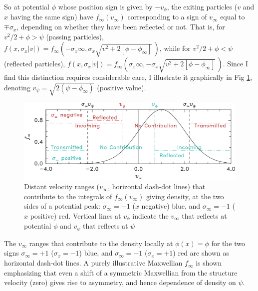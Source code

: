 \documentclass[12pt]{article}
\begin{document}
So at potential $\phi$ whose position sign is given by $-v_\phi$, the
exiting particles ($v$ and $x$ having the same sign) have
$f_\infty(v_\infty)$ corresponding to a sign of $v_\infty$ equal to
$\mp \sigma_x$, depending on whether they have been reflected or not.
That is, for $v^2/2+\phi>\psi$ (passing particles),
$f(x,\sigma_x|v|)=
f_\infty(-\sigma_x\infty,\sigma_x\sqrt{v^2+2[\phi-\phi_\infty]}\,)$,
while for $v^2/2+\phi<\psi$ (reflected particles),
$f(x,\sigma_x|v|)=
f_\infty(\sigma_x\infty,-\sigma_x\sqrt{v^2+2[\phi-\phi_\infty]}\,)$. Since
I find this distinction requires considerable care, I illustrate it
graphically in Fig \ref{contribs}, denoting
$v_\psi=\sqrt{2(\psi-\phi_\infty)}$ (positive value).
\begin{figure}[htp]
\centering
\includegraphics[width=.8\hsize]{contribs}  
\caption{Distant velocity ranges ($v_\infty$, horizontal dash-dot
  lines) that contribute to the integrals of $f_\infty(v_\infty)$
  giving density, at the two sides of a potential peak: $\sigma_\infty=+1$
  ($x$ negative) blue, and $\sigma_\infty=-1$ ($x$ positive) red. Vertical
  lines at $v_\phi$ indicate the $v_\infty$ that reflects at potential
  $\phi$ and $v_\psi$ that reflects at $\psi$ }\label{contribs}
\end{figure}
The $v_\infty$ ranges that contribute to the
density locally at $\phi(x)=\phi$ for the two signs $\sigma_\infty=+1$
($\sigma_x=-1$) blue, and $\sigma_\infty=-1$ ($\sigma_x=+1$) red are
shown as horizontal dash-dot lines.
 A purely
illustrative Maxwellian $f_\infty$ is shown emphasizing that even a
shift of a symmetric Maxwellian from the structure velocity (zero)
gives rise to asymmetry, and hence dependence of density on $\psi$. 
\end{document}
